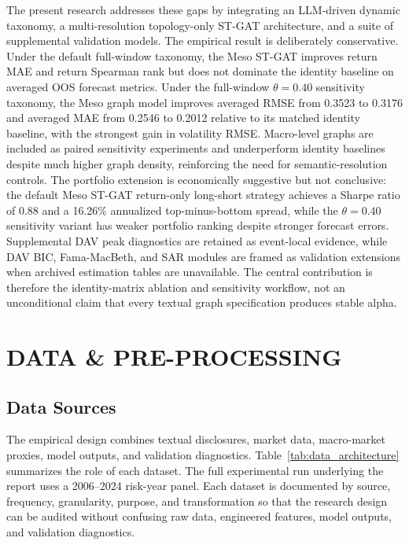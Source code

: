 \documentclass[11pt, a4paper]{article}
\begin{document}
The present research addresses these gaps by integrating an LLM-driven dynamic taxonomy, a multi-resolution topology-only ST-GAT architecture, and a suite of supplemental validation models. The empirical result is deliberately conservative. Under the default full-window taxonomy, the Meso ST-GAT improves return MAE and return Spearman rank but does not dominate the identity baseline on averaged OOS forecast metrics. Under the full-window $\theta=0.40$ sensitivity taxonomy, the Meso graph model improves averaged RMSE from 0.3523 to 0.3176 and averaged MAE from 0.2546 to 0.2012 relative to its matched identity baseline, with the strongest gain in volatility RMSE. Macro-level graphs are included as paired sensitivity experiments and underperform identity baselines despite much higher graph density, reinforcing the need for semantic-resolution controls. The portfolio extension is economically suggestive but not conclusive: the default Meso ST-GAT return-only long-short strategy achieves a Sharpe ratio of 0.88 and a 16.26\% annualized top-minus-bottom spread, while the $\theta=0.40$ sensitivity variant has weaker portfolio ranking despite stronger forecast errors. Supplemental DAV peak diagnostics are retained as event-local evidence, while DAV BIC, Fama-MacBeth, and SAR modules are framed as validation extensions when archived estimation tables are unavailable. The central contribution is therefore the identity-matrix ablation and sensitivity workflow, not an unconditional claim that every textual graph specification produces stable alpha.
\section{DATA \& PRE-PROCESSING}

\subsection{Data Sources}
The empirical design combines textual disclosures, market data, macro-market proxies, model outputs, and validation diagnostics. Table~\ref{tab:data_architecture} summarizes the role of each dataset. The full experimental run underlying the report uses a 2006--2024 risk-year panel. Each dataset is documented by source, frequency, granularity, purpose, and transformation so that the research design can be audited without confusing raw data, engineered features, model outputs, and validation diagnostics.
\end{document}
